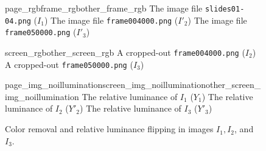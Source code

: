 \begin{figure}
    {page_rgb}{frame_rgb}{other_frame_rgb}%
    {The image file \texttt{slides01-04.png} ($I_1$)}%
    {The image file \texttt{frame004000.png} ($I'_2$)}%
    {The image file \texttt{frame050000.png} ($I'_3$)}\par
    {screen_rgb}{other_screen_rgb}%
    {A cropped-out \texttt{frame004000.png} ($I_2$)}%
    {A cropped-out \texttt{frame050000.png} ($I_3$)}
  \caption{Cropping out a screen from two different video frame images, one
    matching the given lecture slide page and the other one not.}
  \label{fig:system-preprocessing-first}

  \kern\floatsep
    {page_img_noillumination}{screen_img_noillumination}{other_screen_img_noillumination}%
    {The relative luminance of $I_1$ ($Y_1$)}%
    {The relative luminance of $I_2$ ($Y'_2$)}%
    {The relative luminance of $I_3$ ($Y'_3$)}
  \caption{Color removal and relative luminance flipping in images $I_1,
    I_2$, and~$I_3$.}
\end{figure}
